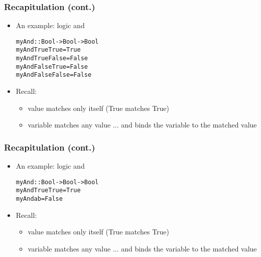 \documentclass[final,handout]{beamer}
\begin{document}
\begin{frame}[fragile]
    \frametitle{Recapitulation (cont.)}

    \begin{itemize}
        \item An example: logic and
            \begin{alltt}
    myAnd :: Bool -> Bool -> Bool \pause
    myAnd True  True   = True
    myAnd True  False  = False
    myAnd False True   = False
    myAnd False False  = False
            \end{alltt}
\pause
        \item Recall:
            \begin{itemize}
                \item value matches only itself (True matches True)
                \item variable matches any value ... and binds the variable to
                    the matched value
            \end{itemize}
  \end{itemize}

\end{frame}  

\begin{frame}[fragile]
    \frametitle{Recapitulation (cont.)}

    \begin{itemize}
        \item An example: logic and
            \begin{alltt}
    myAnd :: Bool -> Bool -> Bool
    myAnd True  True   = True
    myAnd a     b      = False
            \end{alltt}

        \item Recall:
            \begin{itemize}
                \item value matches only itself (True matches True)
                \item variable matches any value ... and binds the variable to
                    the matched value
            \end{itemize}
  \end{itemize}

\end{frame}  
\end{document}
